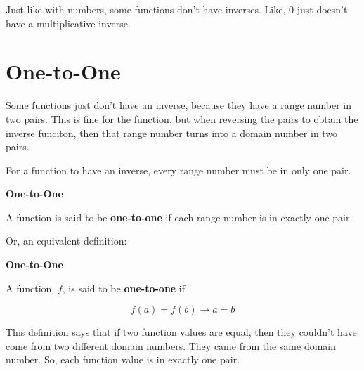 \documentclass{ximera}
\begin{document}
Just like with numbers, some functions don't have inverses.  Like, $0$ just doesn't have a multiplicative inverse.






\section*{One-to-One}


Some functions just don't have an inverse, because they have a range number in two pairs.  This is fine for the function, but when reversing the pairs to obtain the inverse funciton, then that range number turns into a domain number in two pairs.


For a function to have an inverse, every range number must be in only one pair.



\begin{definition} \textbf{\textcolor{green!50!black}{One-to-One}}    


A function is said to be \textbf{one-to-one} if each range number is in exactly one pair.


\end{definition}



Or, an equivalent definition:

\begin{definition} \textbf{\textcolor{green!50!black}{One-to-One}}   


A function, $f$, is said to be \textbf{one-to-one} if 


\[    f(a) = f(b) \rightarrow a = b           \]


\end{definition}





This definition says that if two function values are equal, then they couldn't have come from two different domain numbers.  They came from the same domain number. So, each function value is in exactly one pair.
\end{document}
